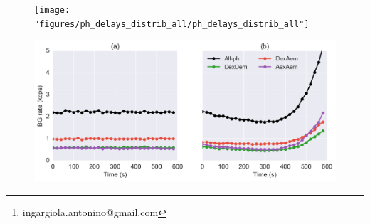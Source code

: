 
\title{}

\author[1]{Antonino Ingargiola\thanks{ingargiola.antonino@gmail.com}}
\author[1]{Eitan Lerner}
\author[1]{SangYoon Chung}
\author[1]{Shimon Weiss}
\author[1]{Xavier Michalet}


\verbatimfont{\small}
\lstset{language=Python}

\maketitle

\begin{abstract}

\end{abstract}

\tableofcontents







\begin{figure}
\begin{center}
\texttt{[image: "figures/ph\_delays\_distrib\_all/ph\_delays\_distrib\_all"]}
\caption[]{}
\end{center}
\end{figure}



\begin{figure}
\begin{center}
\includegraphics[width=\doublefig]{"figures/background_timetrace/background_timetrace"}
\caption[]{}
\end{center}
\end{figure}


